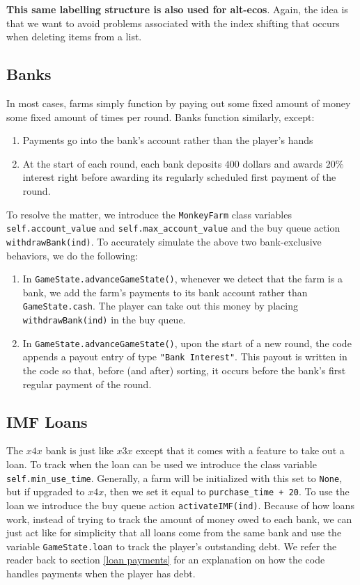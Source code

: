 \documentclass[12pt,letterpaper]{article}
\theoremstyle{remark}
\theoremstyle{plain}
\begin{document}
\textbf{This same labelling structure is also used for alt-ecos}. Again, the idea is that we want to avoid problems associated with the index shifting that occurs when deleting items from a list.

\subsection{Banks}

In most cases, farms simply function by paying out some fixed amount of money some fixed amount of times per round. Banks function similarly, except:
\begin{enumerate}
	\item Payments go into the bank's account rather than the player's hands
	\item At the start of each round, each bank deposits $400$ dollars and awards $20\%$ interest right before awarding its regularly scheduled first payment of the round. 
\end{enumerate}
To resolve the matter, we introduce the \texttt{MonkeyFarm} class variables \texttt{self.account\_value} and \texttt{self.max\_account\_value} and the buy queue action \texttt{withdrawBank(ind)}. To accurately simulate the above two bank-exclusive behaviors, we do the following:
\begin{enumerate}
	\item In \texttt{GameState.advanceGameState()}, whenever we detect that the farm is a bank, we add the farm's payments to its bank account rather than \texttt{GameState.cash}. The player can take out this money by placing \texttt{withdrawBank(ind)} in the buy queue.
	\item In \texttt{GameState.advanceGameState()}, upon the start of a new round, the code appends a payout entry of type \texttt{"Bank Interest"}. This payout is written in the code so that, before (and after) sorting, it occurs before the bank's first regular payment of the round. 
\end{enumerate}

\subsection{IMF Loans}
The $x4x$ bank is just like $x3x$ except that it comes with a feature to take out a loan. To track when the loan can be used we introduce the class variable \texttt{self.min\_use\_time}. Generally, a farm will be initialized with this set to \texttt{None}, but if upgraded to $x4x$, then we set it equal to \texttt{purchase\_time + 20}. To use the loan we introduce the buy queue action \texttt{activateIMF(ind)}. Because of how loans work, instead of trying to track the amount of money owed to each bank, we can just act like for simplicity that all loans come from the same bank and use the variable \texttt{GameState.loan} to track the player's outstanding debt. We refer the reader back to section \ref{loan payments} for an explanation on how the code handles payments when the player has debt.
\end{document}
